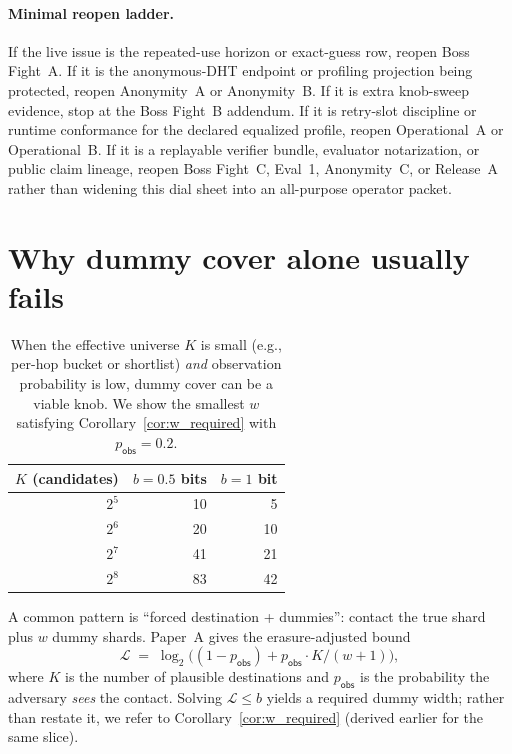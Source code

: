 \documentclass[11pt]{article}
\newcommand{\MaxL}{\mathcal{L}}
\newcommand{\logtwo}{\log_2}
\begin{document}
\paragraph{Minimal reopen ladder.}
If the live issue is the repeated-use horizon or exact-guess row, reopen Boss Fight~A.
If it is the anonymous-DHT endpoint or profiling projection being protected, reopen Anonymity~A or Anonymity~B.
If it is extra knob-sweep evidence, stop at the Boss Fight~B addendum.
If it is retry-slot discipline or runtime conformance for the declared equalized profile, reopen Operational~A or Operational~B.
If it is a replayable verifier bundle, evaluator notarization, or public claim lineage, reopen Boss Fight~C, Eval~1, Anonymity~C, or Release~A rather than widening this dial sheet into an all-purpose operator packet.\cite{series:bossfightA,series:oddsinflation,series:profiling,series:bossfightBaddendum,series:operationalA,series:auditabletrace,series:bossfightC,series:notarizedcerts,series:abomoinl,series:releaseproperty}

\section{Why dummy cover alone usually fails}\label{sec:dummyfails}


\begin{table}[t]
\centering
\caption{When the effective universe $K$ is small (e.g., per-hop bucket or shortlist) \emph{and} observation probability is low, dummy cover can be a viable knob. We show the smallest $w$ satisfying Corollary~\ref{cor:w_required} with $p_{\mathsf{obs}}=0.2$.}
\label{tab:bucket-feasible}
\begin{tabular}{r r r}
\toprule
$K$ (candidates) & $b{=}0.5$ bits & $b{=}1$ bit \\
\midrule
$2^{5}$ & 10 & 5 \\
$2^{6}$ & 20 & 10 \\
$2^{7}$ & 41 & 21 \\
$2^{8}$ & 83 & 42 \\
\bottomrule
\end{tabular}
\end{table}

A common pattern is ``forced destination + dummies'': contact the true shard plus $w$ dummy shards.
Paper~A gives the erasure-adjusted bound
\[
\MaxL \;=\; \logtwo\!\Big((1-p_{\mathsf{obs}})+p_{\mathsf{obs}}\cdot K/(w+1)\Big),
\]
where $K$ is the number of plausible destinations and $p_{\mathsf{obs}}$ is the probability the adversary \emph{sees} the contact.
Solving $\MaxL\le b$ yields a required dummy width; rather than restate it, we refer to Corollary~\ref{cor:w_required} (derived earlier for the same slice).
\end{document}
